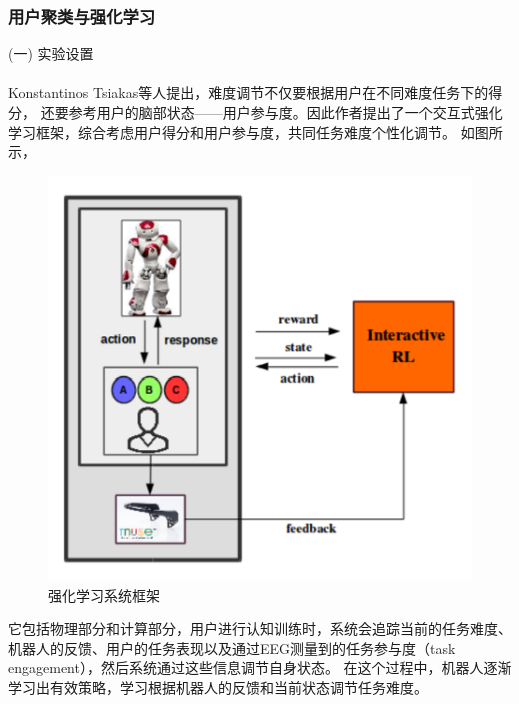 \documentclass{article}
\begin{document}
            \subsubsection{用户聚类与强化学习}
            (一) 实验设置\paragraph{}
            Konstantinos Tsiakas\cite{ref17}等人提出，难度调节不仅要根据用户在不同难度任务下的得分，
            还要参考用户的脑部状态——用户参与度。因此作者提出了一个交互式强化学习框架，综合考虑用户得分和用户参与度，共同任务难度个性化调节。
            如图所示，
            \begin{figure}[H]
            	
            	\centering
            	\includegraphics[scale=0.8]{images/RL_Frame.png}
            	\caption{强化学习系统框架\cite{ref17}}
            	\label{fig:label}
            \end{figure}
            它包括物理部分和计算部分，用户进行认知训练时，系统会追踪当前的任务难度、机器人的反馈、用户的任务表现以及通过EEG测量到的任务参与度（task engagement），然后系统通过这些信息调节自身状态。
            在这个过程中，机器人逐渐学习出有效策略，学习根据机器人的反馈和当前状态调节任务难度。
\end{document}
